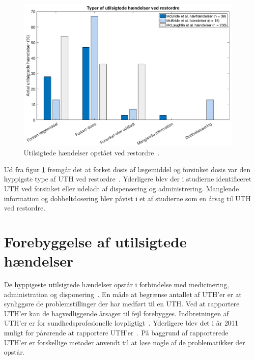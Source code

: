 \begin{figure}[H]\centering
	\includegraphics[width=1\textwidth]{billeder/UTH2.png} 
	\caption{Utilsigtede hændelser opstået ved restordre~\citep{McLaughlin2013,McBride2013}.}
	\label{fig:UTHrestordre}  
\end{figure}

Ud fra figur \ref{fig:UTHrestordre} fremgår det at forket dosis af lægemiddel og forsinket dosis var den hyppigste type af UTH ved restordre~\citep{McLaughlin2013,McBride2013}. Yderligere blev der i studierne identificeret UTH ved forsinket eller udeladt af dispensering og administrering. Manglende information og dobbeltdosering blev påvist i et af studierne som en årsag til UTH ved restordre.~\citep{McLaughlin2013,McBride2013}

\section{Forebyggelse af utilsigtede hændelser}
De hyppigeste utilsigtede hændelser opstår i forbindelse med medicinering, administration og disponering~\citep{Jensen2014}. 
En måde at begrænse antallet af UTH'er er at synliggøre de problemstillinger der har medført til en UTH. Ved at rapportere UTH'er kan de bagvedliggende årsager til fejl forebygges. Indbretningen af UTH'er er for sundhedsprofesionelle lovpligtigt~\citep{Jensen2014}. Yderligere blev det i år 2011 muligt for pårørende at rapportere UTH'er~\citep{Jensen2014}. På baggrund af rapporterede UTH'er er forskellige metoder anvendt til at løse nogle af de problematikker der opstår.

